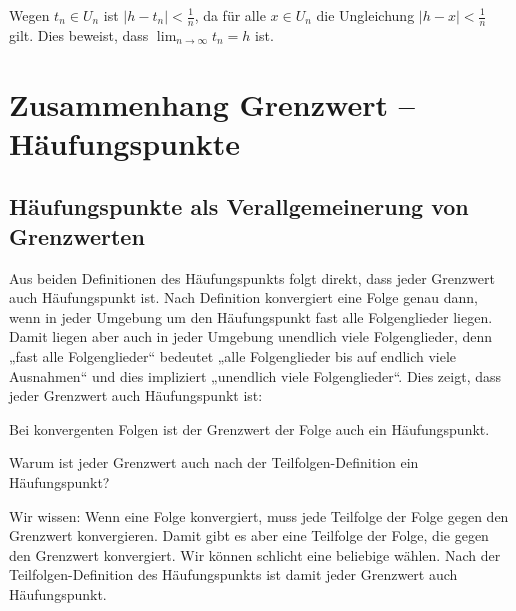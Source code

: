 \documentclass[fontsize=9pt,
               parskip=half-,
               DIV=14,
               listof=chapterentry,
               tocflat]{scrbook}
\newenvironment{indentblock}{\begin{adjustwidth}{.5cm}{}}{\end{adjustwidth}}
\begin{document}
\begin{proof*}
\begin{indentblock}
Wegen $t_{n}\in U_{n}$ ist $|h-t_{n}|<{\tfrac {1}{n}}$, da für alle $x\in U_{n}$ die Ungleichung $|h-x|<{\tfrac {1}{n}}$ gilt. Dies beweist, dass $\lim _{n\to \infty }t_{n}=h$ ist.

\end{indentblock}

\end{proof*}

\section{Zusammenhang Grenzwert – Häufungspunkte}

\subsection{Häufungspunkte als Verallgemeinerung von Grenzwerten}

Aus beiden Definitionen des Häufungspunkts folgt direkt, dass jeder Grenzwert auch Häufungspunkt ist. Nach Definition konvergiert eine Folge genau dann, wenn in jeder Umgebung um den Häufungspunkt fast alle Folgenglieder liegen. Damit liegen aber auch in jeder Umgebung unendlich viele Folgenglieder, denn „fast alle Folgenglieder“ bedeutet „alle Folgenglieder bis auf endlich viele Ausnahmen“ und dies impliziert „unendlich viele Folgenglieder“. Dies zeigt, dass jeder Grenzwert auch Häufungspunkt ist:

\begin{theorem*}
Bei konvergenten Folgen ist der Grenzwert der Folge auch ein Häufungspunkt.

\end{theorem*}

\begin{mdframed}[style=semanticbox,frametitleaboveskip=3pt,innerbottommargin=3pt,frametitle=Frage]
Warum ist jeder Grenzwert auch nach der Teilfolgen-Definition ein Häufungspunkt?

\end{mdframed}

\begin{answer*}
Wir wissen: Wenn eine Folge konvergiert, muss jede Teilfolge der Folge gegen den Grenzwert konvergieren. Damit gibt es aber eine Teilfolge der Folge, die gegen den Grenzwert konvergiert. Wir können schlicht eine beliebige wählen. Nach der Teilfolgen-Definition des Häufungspunkts ist damit jeder Grenzwert auch Häufungspunkt.

\end{answer*}
\end{document}
